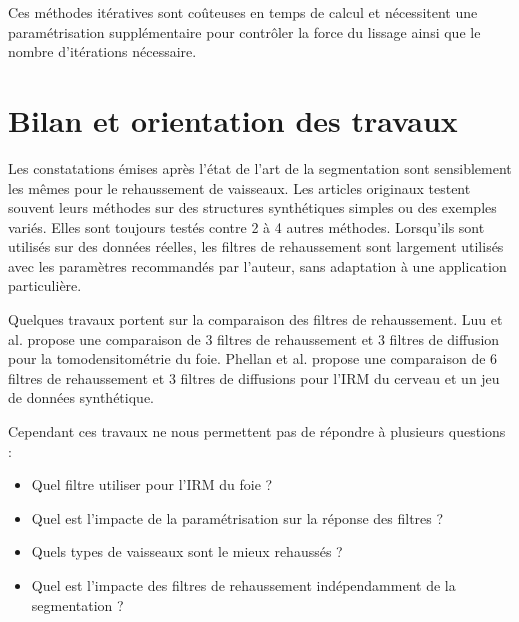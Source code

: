 Ces méthodes itératives sont coûteuses en temps de calcul et nécessitent une paramétrisation supplémentaire pour contrôler la force du lissage ainsi que le nombre d'itérations nécessaire.

\section{Bilan et orientation des travaux}
\label{sec:EA:bilan}

Les constatations émises après l'état de l'art de la segmentation sont sensiblement les mêmes pour le rehaussement de vaisseaux. Les articles originaux testent souvent leurs méthodes sur des structures synthétiques simples ou des exemples variés. Elles sont toujours testés contre 2 à 4 autres méthodes. Lorsqu'ils sont utilisés sur des données réelles, les filtres de rehaussement sont largement utilisés avec les paramètres recommandés par l'auteur, sans adaptation à une application particulière.

Quelques travaux portent sur la comparaison des filtres de rehaussement. Luu et al. \cite{Luu2015_liver_vesselness_comparison} propose une comparaison de 3 filtres de rehaussement et 3 filtres de diffusion pour la tomodensitométrie du foie. Phellan et al. \cite{Phellan2017_Brain_vesselness_comparison} propose une comparaison de 6 filtres de rehaussement et 3 filtres de diffusions pour l'IRM du cerveau et un jeu de données synthétique.

Cependant ces travaux ne nous permettent pas de répondre à plusieurs questions :

\begin{itemize}
\item Quel filtre utiliser pour l'IRM du foie ?
\item Quel est l'impacte de la paramétrisation sur la réponse des filtres ?
\item Quels types de vaisseaux sont le mieux rehaussés ?
\item Quel est l'impacte des filtres de rehaussement indépendamment de la segmentation ?
\end{itemize}
